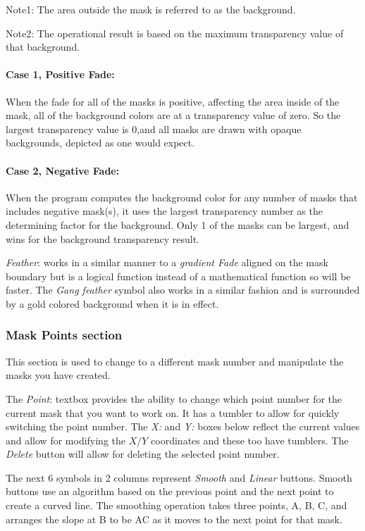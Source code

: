 Note1: The area outside the mask is referred to as the background.

Note2: The operational result is based on the maximum transparency value of that background.

\paragraph{Case 1, Positive Fade:} When the fade for all of the masks is positive, affecting the area inside of the mask, all of the
background colors are at a transparency value of zero. So the largest transparency value is 0,and all masks are drawn with opaque backgrounds, depicted as one would expect.

\paragraph{Case 2, Negative Fade:} When the program computes the background color for any number of masks that includes negative
mask(s), it uses the largest transparency number as the determining factor for the background. Only 1 of the masks can be largest, and wins for the background transparency result.

\vspace{3ex}\textit{Feather}: works in a similar manner to a \textit{gradient Fade} aligned on the mask boundary but is a logical function instead of a mathematical function so will be faster.  The \textit{Gang feather} symbol also works in a similar fashion and is surrounded by a gold colored background when it is in effect.

\subsubsection*{Mask Points section}%
\label{ssub:masks_points_section}

This section is used to change to a different mask number and manipulate the masks you have created.

The \textit{Point}: textbox provides the ability to change which point number for the current mask that you want to work on.  It has a tumbler to allow for quickly switching the point number.  The \textit{X:} and \textit{Y:} boxes below reflect the current values and allow for modifying the $X/Y$ coordinates and these too have tumblers. The \textit{Delete} button will allow for deleting the selected point number.

The next 6 symbols in 2 columns represent \textit{Smooth} and \textit{Linear} buttons.  Smooth buttons use an algorithm based on the previous point and the next point to create a curved line. The smoothing operation takes three points, A, B, C, and arranges the slope at B to be AC as it moves to the next point for that mask.

